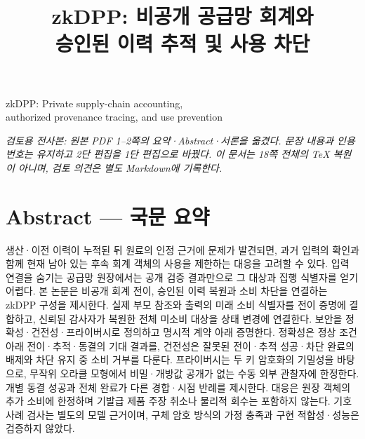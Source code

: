 \documentclass[11pt,a4paper]{article}
\title{zkDPP: 비공개 공급망 회계와\\승인된 이력 추적 및 사용 차단}
\author{}
\date{}
\begin{document}
\maketitle
\begin{center}
    zkDPP: Private supply-chain accounting,\\
    authorized provenance tracing, and use prevention
\end{center}
\noindent\textit{검토용 전사본: 원본 PDF 1--2쪽의 요약·Abstract·서론을 옮겼다.
    문장 내용과 인용 번호는 유지하고 2단 편집을 1단 편집으로 바꿨다.
    이 문서는 18쪽 전체의 TeX 복원이 아니며, 검토 의견은 별도 Markdown에 기록한다.}

\section*{Abstract — 국문 요약}
생산·이전 이력이 누적된 뒤 원료의 인정 근거에 문제가 발견되면, 과거 입력의 확인과 함께 현재 남아 있는 후속 회계 객체의 사용을 제한하는 대응을 고려할 수 있다.
입력 연결을 숨기는 공급망 원장에서는 공개 검증 결과만으로 그 대상과 집행 식별자를 얻기 어렵다.
본 논문은 비공개 회계 전이, 승인된 이력 복원과 소비 차단을 연결하는 zkDPP 구성을 제시한다.
실제 부모 참조와 출력의 미래 소비 식별자를 전이 증명에 결합하고, 신뢰된 감사자가 복원한 전체 미소비 대상을 상태 변경에 연결한다.
보안을 정확성·건전성·프라이버시로 정의하고 명시적 계약 아래 증명한다.
정확성은 정상 조건 아래 전이·추적·동결의 기대 결과를, 건전성은 잘못된 전이·추적 성공·차단 완료의 배제와 차단 유지 중 소비 거부를 다룬다.
프라이버시는 두 키 암호화의 기밀성을 바탕으로, 무작위 오라클 모형에서 비밀·개방값 공개가 없는 수동 외부 관찰자에 한정한다.
개별 동결 성공과 전체 완료가 다른 경합·시점 반례를 제시한다.
대응은 원장 객체의 추가 소비에 한정하며 기발급 제품 주장 취소나 물리적 회수는 포함하지 않는다.
기호 사례 검사는 별도의 모델 근거이며, 구체 암호 방식의 가정 충족과 구현 적합성·성능은 검증하지 않았다.

\clearpage
\end{document}
